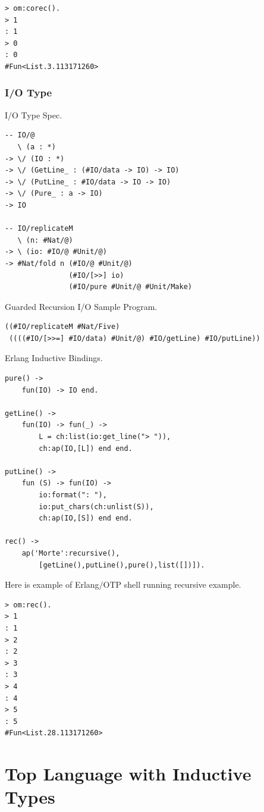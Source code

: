 \documentclass[11pt,oneside]{article}
\begin{document}
\begin{lstlisting}[mathescape=true]
> om:corec().
> 1
: 1
> 0
: 0
#Fun<List.3.113171260>
\end{lstlisting}

\newpage

\subsubsection{I/O Type}

I/O Type Spec.

\begin{lstlisting}[mathescape=true]
-- IO/@
   \ (a : *)
-> \/ (IO : *)
-> \/ (GetLine_ : (#IO/data -> IO) -> IO)
-> \/ (PutLine_ : #IO/data -> IO -> IO)
-> \/ (Pure_ : a -> IO)
-> IO

-- IO/replicateM
   \ (n: #Nat/@)
-> \ (io: #IO/@ #Unit/@)
-> #Nat/fold n (#IO/@ #Unit/@)
               (#IO/[>>] io)
               (#IO/pure #Unit/@ #Unit/Make)
\end{lstlisting}

Guarded Recursion I/O Sample Program.

\begin{lstlisting}[mathescape=true]
((#IO/replicateM #Nat/Five)
 ((((#IO/[>>=] #IO/data) #Unit/@) #IO/getLine) #IO/putLine))
\end{lstlisting}

Erlang Inductive Bindings.

\begin{lstlisting}[mathescape=true]
pure() ->
    fun(IO) -> IO end.

getLine() ->
    fun(IO) -> fun(_) ->
        L = ch:list(io:get_line("> ")),
        ch:ap(IO,[L]) end end.

putLine() ->
    fun (S) -> fun(IO) ->
        io:format(": "),
        io:put_chars(ch:unlist(S)),
        ch:ap(IO,[S]) end end.

rec() ->
    ap('Morte':recursive(),
        [getLine(),putLine(),pure(),list([])]).
\end{lstlisting}


Here is example of Erlang/OTP shell running recursive example.

\begin{lstlisting}[mathescape=true]
> om:rec().
> 1
: 1
> 2
: 2
> 3
: 3
> 4
: 4
> 5
: 5
#Fun<List.28.113171260>
\end{lstlisting}




\newpage
\section{Top Language with Inductive Types}
\end{document}
